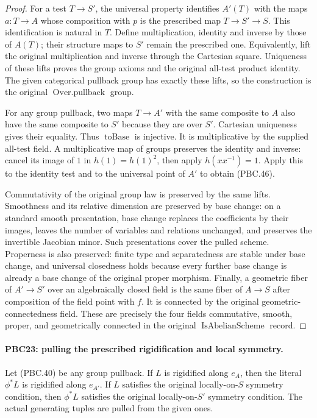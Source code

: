 \begin{proof}
For a test $T\to S'$, the universal property identifies
$A'(T)$ with the maps $a:T\to A$ whose composition with
$p$ is the prescribed map $T\to S'\to S$.
This identification is natural in $T$.  Define multiplication,
identity and inverse by those of $A(T)$; their structure
maps to $S'$ remain the prescribed one.
Equivalently, lift the original multiplication and inverse
through the Cartesian square.  Uniqueness of these lifts
proves the group axioms and the original all-test product
identity.  The given categorical pullback group has exactly
these lifts, so the construction is the original
$\operatorname{Over.pullback}$ group.

For any group pullback, two maps $T\to A'$ with the same
composite to $A$ also have the same composite to $S'$
because they are over $S'$.  Cartesian uniqueness gives
their equality.  Thus $\operatorname{toBase}$ is injective.
It is multiplicative by the supplied all-test field.
A multiplicative map of groups preserves the identity
and inverse: cancel its image of $1$ in
$h(1)=h(1)^2$, then apply $h(xx^{-1})=1$.
Apply this to the identity test and to the universal point
of $A'$ to obtain (PBC.46).

Commutativity of the original group law is preserved by
the same lifts.  Smoothness and its relative dimension
are preserved by base change: on a standard smooth
presentation, base change replaces the coefficients by
their images, leaves the number of variables and relations
unchanged, and preserves the invertible Jacobian minor.
Such presentations cover the pulled scheme.
Properness is also preserved: finite type and separatedness
are stable under base change, and universal closedness
holds because every further base change is already a base
change of the original proper morphism.
Finally, a geometric fiber of $A'\to S'$ over an
algebraically closed field is the same fiber of $A\to S$
after composition of the field point with $f$.
It is connected by the original geometric-connectedness
field.  These are precisely the four fields
commutative, smooth, proper, and geometrically connected
in the original $\operatorname{IsAbelianScheme}$ record.
\end{proof}

\paragraph{PBC23: pulling the prescribed rigidification and local symmetry.}
\label{claim:PBC23}
Let (PBC.40) be any group pullback.
If $L$ is rigidified along $e_A$, then the literal $\phi^*L$
is rigidified along $e_{A'}$.
If $L$ satisfies the original locally-on-$S$ symmetry
condition, then $\phi^*L$ satisfies the original
locally-on-$S'$ symmetry condition.
The actual generating tuples are pulled from the given ones.

